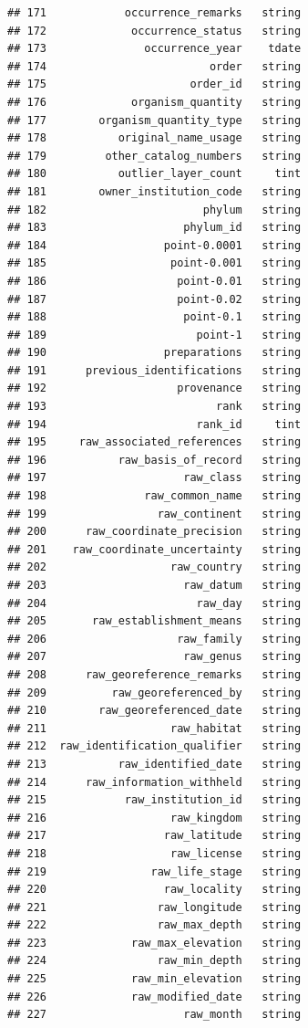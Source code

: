 \documentclass[
  10pt,
]{article}
\begin{document}
\begin{verbatim}
## 171            occurrence_remarks   string
## 172             occurrence_status   string
## 173               occurrence_year    tdate
## 174                         order   string
## 175                      order_id   string
## 176             organism_quantity   string
## 177        organism_quantity_type   string
## 178           original_name_usage   string
## 179         other_catalog_numbers   string
## 180           outlier_layer_count     tint
## 181        owner_institution_code   string
## 182                        phylum   string
## 183                     phylum_id   string
## 184                  point-0.0001   string
## 185                   point-0.001   string
## 186                    point-0.01   string
## 187                    point-0.02   string
## 188                     point-0.1   string
## 189                       point-1   string
## 190                  preparations   string
## 191      previous_identifications   string
## 192                    provenance   string
## 193                          rank   string
## 194                       rank_id     tint
## 195     raw_associated_references   string
## 196           raw_basis_of_record   string
## 197                     raw_class   string
## 198               raw_common_name   string
## 199                 raw_continent   string
## 200      raw_coordinate_precision   string
## 201    raw_coordinate_uncertainty   string
## 202                   raw_country   string
## 203                     raw_datum   string
## 204                       raw_day   string
## 205       raw_establishment_means   string
## 206                    raw_family   string
## 207                     raw_genus   string
## 208      raw_georeference_remarks   string
## 209          raw_georeferenced_by   string
## 210        raw_georeferenced_date   string
## 211                   raw_habitat   string
## 212  raw_identification_qualifier   string
## 213           raw_identified_date   string
## 214      raw_information_withheld   string
## 215            raw_institution_id   string
## 216                   raw_kingdom   string
## 217                  raw_latitude   string
## 218                   raw_license   string
## 219                raw_life_stage   string
## 220                  raw_locality   string
## 221                 raw_longitude   string
## 222                 raw_max_depth   string
## 223             raw_max_elevation   string
## 224                 raw_min_depth   string
## 225             raw_min_elevation   string
## 226             raw_modified_date   string
## 227                     raw_month   string

\end{verbatim}
\end{document}
